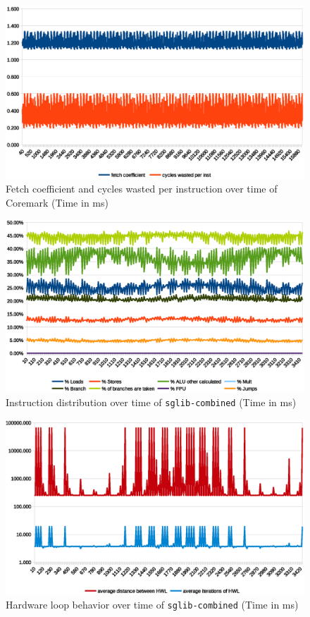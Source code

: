 \documentclass[../bachelor_paper.tex]{subfiles}
\begin{document}
\begin{figure}
    \centering
    \includegraphics[width=\textwidth]{img/graph/coremark/coremark_fetch_waste.eps}
    \caption{Fetch coefficient and cycles wasted per instruction over time of Coremark (Time in ms)}
    \label{fig:res/coremark/fetch_waste}
\end{figure}

\begin{figure}
    \centering
    \includegraphics[width=\textwidth]{img/graph/embench/sglib-combined_inst.eps}
    \caption{Instruction distribution over time of \texttt{sglib-combined} (Time in ms)}
    \label{fig:res/sglib/inst}
\end{figure}

\begin{figure}
    \centering
    \includegraphics[width=\textwidth]{img/graph/embench/sglib-combined_hwl.eps}
    \caption{Hardware loop behavior over time of \texttt{sglib-combined} (Time in ms)}
    \label{fig:res/sglib/hwl}
\end{figure}
\end{document}
